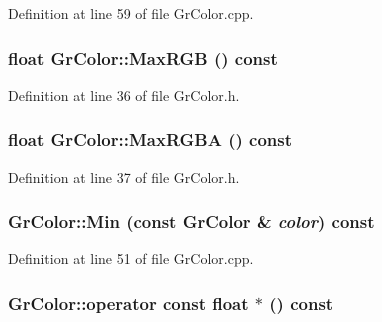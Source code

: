 Definition at line 59 of file GrColor.cpp.\hypertarget{class_gr_color_433f7b7fb1d4b548968b337797d1043b}{
\subsubsection[{MaxRGB}]{\setlength{\rightskip}{0pt plus 5cm}float GrColor::MaxRGB () const}}
\label{class_gr_color_433f7b7fb1d4b548968b337797d1043b}




Definition at line 36 of file GrColor.h.\hypertarget{class_gr_color_ecd825693d1a321c285e6fc68b918b2b}{
\subsubsection[{MaxRGBA}]{\setlength{\rightskip}{0pt plus 5cm}float GrColor::MaxRGBA () const}}
\label{class_gr_color_ecd825693d1a321c285e6fc68b918b2b}




Definition at line 37 of file GrColor.h.\hypertarget{class_gr_color_8fbcd991fa1427da6be51d5d7070861f}{
\subsubsection[{Min}]{ GrColor::Min (const {\bf GrColor} \& {\em color}) const}}
\label{class_gr_color_8fbcd991fa1427da6be51d5d7070861f}




Definition at line 51 of file GrColor.cpp.\hypertarget{class_gr_color_92fd3a452f76e0243a775daf3b237b48}{
\subsubsection[{operator const float $\ast$}]{\setlength{\rightskip}{0pt plus 5cm}GrColor::operator const float $\ast$ () const}}
\label{class_gr_color_92fd3a452f76e0243a775daf3b237b48}




